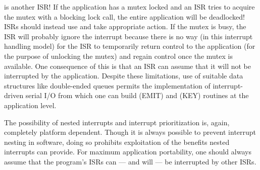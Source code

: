 \documentclass{article}
\begin{document}
is another ISR! If the application has a mutex locked and an ISR tries
to acquire the mutex with a blocking lock call, the entire application
will be deadlocked! ISRs should instead use  and take
appropriate action. If the mutex is busy, the ISR will probably ignore
the interrupt because there is no way (in this interrupt handling model)
for the ISR to temporarily return control to the application (for the
purpose of unlocking the mutex) and regain control once the mutex is
available. One consequence of this is that an ISR can assume that it
will not be interrupted by the application. Despite these limitations,
use of suitable data structures like double-ended queues permits the
implementation of interrupt-driven serial I/O from which one can build
(EMIT) and (KEY) routines at the application level.

The possibility of nested interrupts and interrupt prioritization is,
again, completely platform dependent. Though it is always possible to
prevent interrupt nesting in software, doing so prohibits exploitation
of the benefits nested interrupts can provide. For maximum application
portability, one should always assume that the program's ISRs can ---
and will --- be interrupted by other ISRs.
\end{document}
